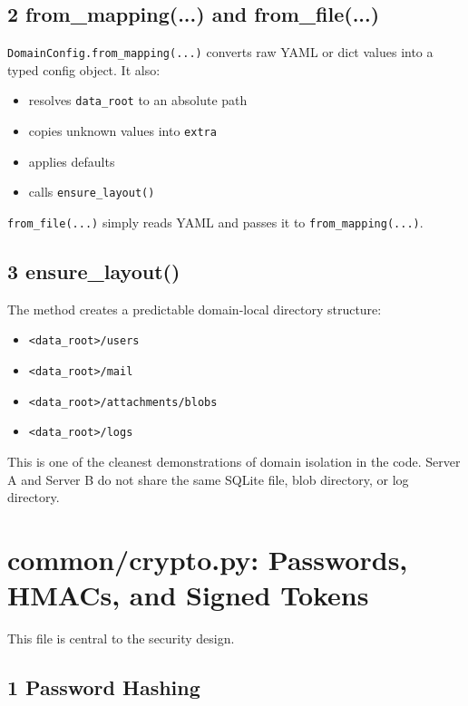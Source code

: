 \documentclass[11pt,a4paper]{article}
\begin{document}
\subsection{2 from\_mapping(...) and from\_file(...)}

\nolinkurl{DomainConfig.from_mapping(...)} converts raw YAML or dict values into a typed config object. It also:

\begin{itemize}
\item resolves \nolinkurl{data_root} to an absolute path
\item copies unknown values into \nolinkurl{extra}
\item applies defaults
\item calls \nolinkurl{ensure_layout()}
\end{itemize}

\nolinkurl{from_file(...)} simply reads YAML and passes it to \nolinkurl{from_mapping(...)}.

\subsection{3 ensure\_layout()}

The method creates a predictable domain-local directory structure:

\begin{itemize}
\item \nolinkurl{<data_root>/users}
\item \nolinkurl{<data_root>/mail}
\item \nolinkurl{<data_root>/attachments/blobs}
\item \nolinkurl{<data_root>/logs}
\end{itemize}

This is one of the cleanest demonstrations of domain isolation in the code. Server A and Server B do not share the same SQLite file, blob directory, or log directory.


\section{common/crypto.py: Passwords, HMACs, and Signed Tokens}

This file is central to the security design.

\subsection{1 Password Hashing}
\end{document}
